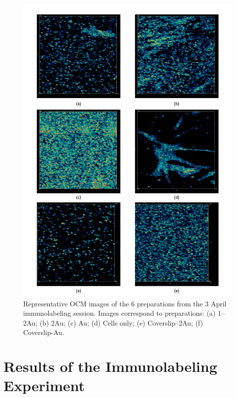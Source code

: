 \begin{figure}[p]
\centering
\includegraphics[keepaspectratio,width=\textwidth,height=0.75\textheight]{3aprOCMreps.pdf}
\caption{Representative OCM images of the 6 preparations from the 3 April immunolabeling session. Images correspond to preparations: (a) 1--2Au; (b) 2Au; (c) Au; (d) Cells only; (e) Coverslip--2Au; (f) Coverslip-Au.}
\label{aprocmreps}
\end{figure}

\section{Results of the Immunolabeling Experiment}
\label{resultsoftheimmunolabelingexperiment}

